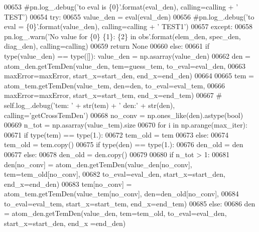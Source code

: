 \begin{DoxyCode}
{{{{00653             \textcolor{comment}{#pn.log\_.debug('to eval is \{0\}'.format(eval\_den), calling=calling + ' TEST')}
00654             \textcolor{keywordflow}{try}:
00655                 value\_den = eval(eval\_den)
00656                 \textcolor{comment}{#pn.log\_.debug('to eval = \{0\}'.format(value\_den), calling=calling + ' TEST1')}
00657             \textcolor{keywordflow}{except}:
00658                 pn.log\_.warn(\textcolor{stringliteral}{'No value for \{0\} \{1\}: \{2\} in obs'}.format(elem\_den, spec\_den, diag\_den), 
      calling=calling)
00659                 \textcolor{keywordflow}{return} \textcolor{keywordtype}{None}
00660         \textcolor{keywordflow}{else}:
00661             \textcolor{keywordflow}{if} type(value\_den) == type([]): value\_den = np.asarray(value\_den)
00662         den = atom\_den.getTemDen(value\_den, tem=guess\_tem, to\_eval=eval\_den,
00663                                  maxError=maxError, start\_x=start\_den, end\_x=end\_den)
00664         
00665         tem = atom\_tem.getTemDen(value\_tem, den=den, to\_eval=eval\_tem,
00666                                  maxError=maxError, start\_x=start\_tem, end\_x=end\_tem)
00667 \textcolor{comment}{#        self.log\_.debug('tem: ' + str(tem) + ' den:' + str(den), calling='getCrossTemDen')}
00668         no\_conv = np.ones\_like(den).astype(bool)
00669         n\_tot = np.asarray(value\_tem).size
00670         \textcolor{keywordflow}{for} i \textcolor{keywordflow}{in} np.arange(max\_iter):
00671             \textcolor{keywordflow}{if} type(tem) == type(1.):
00672                 tem\_old = tem
00673             \textcolor{keywordflow}{else}:
00674                 tem\_old = tem.copy()
00675             \textcolor{keywordflow}{if} type(den) == type(1.):
00676                 den\_old = den
00677             \textcolor{keywordflow}{else}:
00678                 den\_old = den.copy()
00679             
00680             \textcolor{keywordflow}{if} n\_tot > 1:
00681                 den[no\_conv] = atom\_den.getTemDen(value\_den[no\_conv], tem=tem\_old[no\_conv],
00682                                                   to\_eval=eval\_den, start\_x=start\_den, end\_x=end\_den)
00683                 tem[no\_conv] = atom\_tem.getTemDen(value\_tem[no\_conv], den=den\_old[no\_conv],
00684                                                   to\_eval=eval\_tem, start\_x=start\_tem, end\_x=end\_tem)
00685             \textcolor{keywordflow}{else}:
00686                 den = atom\_den.getTemDen(value\_den, tem=tem\_old, to\_eval=eval\_den, start\_x=start\_den, end\_x
      =end\_den)
}}}}
\end{DoxyCode}
